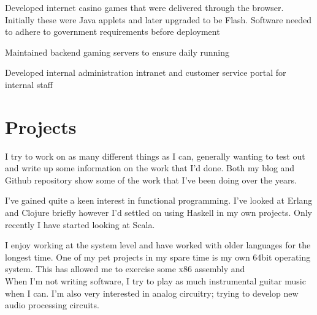 \documentclass[letterpaper]{deedy-resume} %
\begin{document}
\begin{minipage}[t]{0.66\textwidth}
\sectionspace %



\begin{tightitemize}
\item Developed internet casino games that were delivered through the browser. Initially these were Java applets and later upgraded to be Flash. Software needed to adhere to government requirements before deployment
\item Maintained backend gaming servers to ensure daily running
\item Developed internal administration intranet and customer service portal for internal staff
\end{tightitemize}

\sectionspace %

\section{Projects}

I try to work on as many different things as I can, generally wanting to test out and write up some information on the work that I'd done. Both my blog and Github repository show some of the work that I've been doing over the years. \\

\vspace{5mm} 

I've gained quite a keen interest in functional programming. I've looked at Erlang and Clojure briefly however I'd settled on using Haskell in my own projects. Only recently I have started looking at Scala. \\

\vspace{5mm} 

I enjoy working at the system level and have worked with older languages for the longest time. One of my pet projects in my spare time is my own 64bit operating system. This has allowed me to exercise some x86 assembly and \\ 

When I'm not writing software, I try to play as much instrumental guitar music when I can. I'm also very interested in analog circuitry; trying to develop new audio processing circuits.

\end{minipage} %
\end{document}
